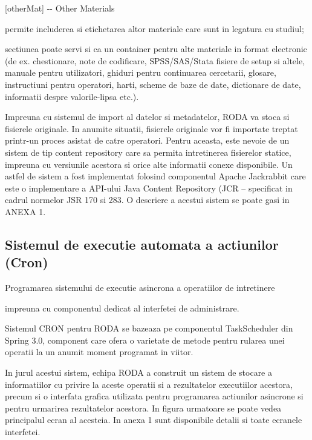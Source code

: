 \documentclass[a4paper, 10pt]{article}
\begin{document}
{\bigskip

[otherMat] -{}- Other Materials

permite includerea si etichetarea altor materiale care sunt in legatura cu studiul;

sectiunea poate servi si ca un {\textquotedbl}container{\textquotedbl} pentru alte materiale in format electronic (de ex. chestionare, note de codificare, SPSS/SAS/Stata fisiere de setup si altele, manuale pentru utilizatori, ghiduri pentru continuarea cercetarii, glosare, instructiuni pentru operatori, harti, scheme de baze de date, dictionare de date, informatii despre valorile-lipsa etc.).


\bigskip

Impreuna cu sistemul de import al datelor si metadatelor, RODA va stoca si fisierele originale. In anumite situatii, fisierele originale vor fi importate treptat printr-un proces asistat de catre operatori. Pentru aceasta, este nevoie de un sistem de tip content repository care sa permita intretinerea fisierelor statice, impreuna cu versiunile acestora si orice alte informatii conexe disponibile. Un astfel de sistem a fost implementat folosind componentul Apache Jackrabbit care este o implementare a API{}-ului Java Content Repository (JCR -- specificat in cadrul normelor JSR 170 si 283. O descriere a acestui sistem se poate gasi in ANEXA 1. 


\bigskip

\subsection*{Sistemul de executie automata a actiunilor (Cron)}

\bigskip

Programarea sistemului de executie asincrona a operatiilor de intretinere

impreuna cu componentul dedicat al interfetei de administrare.


\bigskip

Sistemul CRON pentru RODA se bazeaza pe componentul TaskScheduler din Spring 3.0, component care ofera o varietate de metode pentru rularea unei operatii la un anumit moment programat in viitor. 


\bigskip

In jurul acestui sistem, echipa RODA a construit un sistem de stocare a informatiilor cu privire la aceste operatii si a rezultatelor executiilor acestora, precum si o interfata grafica utilizata pentru programarea actiunilor asincrone si pentru urmarirea rezultatelor acestora. In figura urmatoare se poate vedea principalul ecran al acesteia. In anexa 1 sunt disponibile detalii si toate ecranele interfetei.


}
\end{document}
